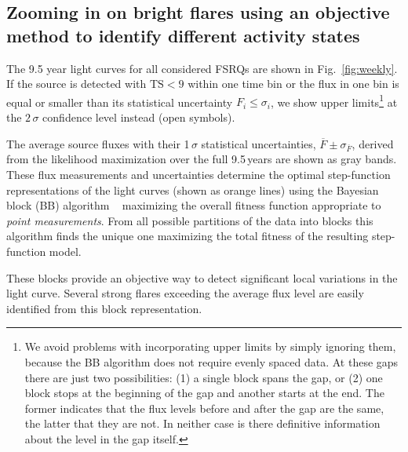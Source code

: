 \documentclass[twocolumn,linenumbers]{aastex62}
\begin{document}
\subsection{Zooming in on bright flares using an objective method to identify different activity states}
\label{sec:zoom}

The 9.5 year light curves for all considered FSRQs are shown in Fig.~\ref{fig:weekly}. If the source is detected with $\mathrm{TS} < 9$ within one time bin or the flux in one bin is equal or smaller than its statistical uncertainty $F_i \leqslant \sigma_i$, we show upper limits\footnote{We avoid 
problems with incorporating upper limits by simply ignoring them, because the BB algorithm does not require evenly spaced data. At these gaps there
are just two possibilities:
(1) a single block spans the gap,
or 
(2) one block stops at the beginning of
the gap and another starts at the end.
The former indicates that the flux levels
before and after the gap are the same,
the latter that they are not.
In neither case is there definitive 
information about the level in the
gap itself.}
at the $2\,\sigma$ confidence level instead (open symbols).

The average source fluxes with their 1$\,\sigma$ statistical uncertainties, $\overline{F} \pm \sigma_{\overline{F}}$, derived from the likelihood maximization over the full 9.5\,years are shown as gray bands. 
These flux measurements and uncertainties determine the optimal step-function representations of the light curves (shown as orange lines) using the Bayesian block (BB) 
algorithm ~\citep[][]{2013ApJ...764..167S} maximizing the overall fitness function appropriate to \textit{point measurements}.
From all possible partitions of the data into blocks this algorithm finds the unique one maximizing the total fitness of the resulting step-function model.


These blocks provide an objective way to detect significant local variations in the light curve.
Several strong flares exceeding the average flux level are easily identified from this block representation. 
\end{document}
